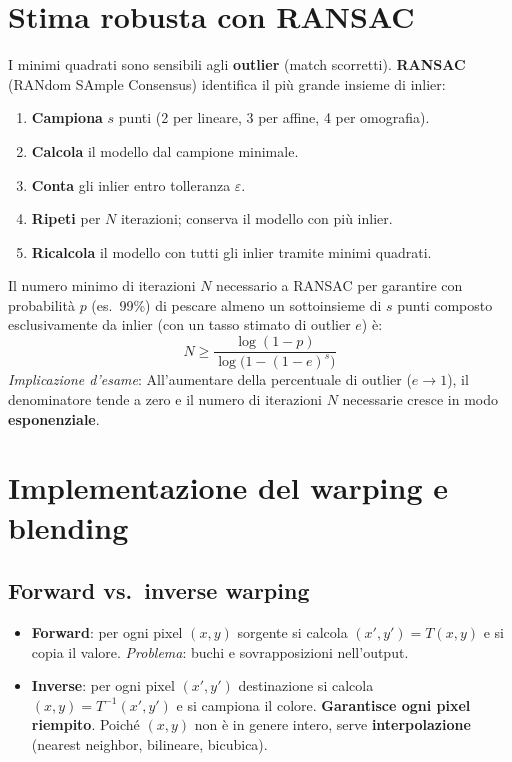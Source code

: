 \documentclass[12pt, a4paper]{report}
\begin{document}
\section{Stima robusta con RANSAC}

I minimi quadrati sono sensibili agli \textbf{outlier} (match scorretti).
\textbf{RANSAC} (RANdom SAmple Consensus) identifica il più grande insieme
di inlier:

\begin{enumerate}
  \item \textbf{Campiona} $s$ punti (2 per lineare, 3 per affine, 4 per omografia).
  \item \textbf{Calcola} il modello dal campione minimale.
  \item \textbf{Conta} gli inlier entro tolleranza $\varepsilon$.
  \item \textbf{Ripeti} per $N$ iterazioni; conserva il modello con più inlier.
  \item \textbf{Ricalcola} il modello con tutti gli inlier tramite minimi quadrati.
\end{enumerate}

\begin{defbox}
Il numero minimo di iterazioni $N$ necessario a RANSAC per garantire con probabilità $p$ (es.\ 99\%) di pescare almeno un sottoinsieme di $s$ punti composto esclusivamente da inlier (con un tasso stimato di outlier $e$) è:
\[
  N \ge \frac{\log(1 - p)}{\log\bigl(1 - (1 - e)^s\bigr)}
\]
\textit{Implicazione d'esame}: All'aumentare della percentuale di outlier ($e \to 1$), il denominatore tende a zero e il numero di iterazioni $N$ necessarie cresce in modo \textbf{esponenziale}.
\end{defbox}

\section{Implementazione del warping e blending}

\subsection{Forward vs.\ inverse warping}

\begin{itemize}
  \item \textbf{Forward}: per ogni pixel $(x,y)$ sorgente si calcola
        $(x',y')=T(x,y)$ e si copia il valore. \textit{Problema}: buchi e
        sovrapposizioni nell'output.
  \item \textbf{Inverse}: per ogni pixel $(x',y')$ destinazione si calcola
        $(x,y)=T^{-1}(x',y')$ e si campiona il colore. \textbf{Garantisce ogni
        pixel riempito}. Poiché $(x,y)$ non è in genere intero, serve
        \textbf{interpolazione} (nearest neighbor, bilineare, bicubica).
\end{itemize}
\end{document}
